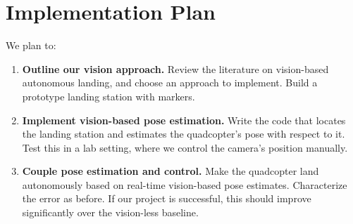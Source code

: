 \section*{Implementation Plan}

We plan to:
\begin{enumerate}

\item {\bf Outline our vision approach.} Review the literature on vision-based
autonomous landing, and choose an approach to implement. Build a prototype
landing station with markers.

\item {\bf Implement vision-based pose estimation.} Write the code that locates
the landing station and estimates the quadcopter's pose with respect to it.
Test this in a lab setting, where we control the camera's position manually.

\item {\bf Couple pose estimation and control.} Make the quadcopter land
autonomously based on real-time vision-based pose estimates. Characterize the
error as before. If our project is successful, this should improve
significantly over the vision-less baseline.

\end{enumerate}
